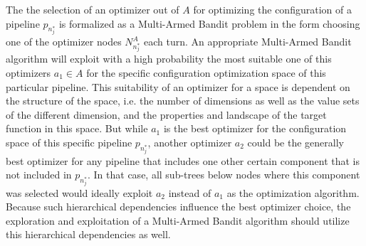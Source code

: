 The the selection of an optimizer out of $A$ for optimizing the configuration of a pipeline $p_{n^*_j}$ is formalized as a Multi-Armed Bandit problem in the form choosing one of the optimizer nodes $N^A_{n^*_j}$ each turn.
An appropriate Multi-Armed Bandit algorithm will exploit with a high probability the most suitable one of this optimizers $a_1 \in A$ for the specific configuration optimization space of this particular pipeline.
This suitability of an optimizer for a space is dependent on the structure of the space, i.e. the number of dimensions as well as the value sets of the different dimension, and the properties and landscape of the target function in this space.\newline
But while $a_1$ is the best optimizer for the configuration space of this specific pipeline $p_{n^*_j}$, another optimizer $a_2$ could be the generally best optimizer for any pipeline that includes one other certain component that is not included in $p_{n^*_j}$.
In that case, all sub-trees below nodes where this component was selected would ideally exploit $a_2$ instead of $a_1$ as the optimization algorithm.
Because such hierarchical dependencies influence the best optimizer choice, the exploration and exploitation of a Multi-Armed Bandit algorithm should utilize this hierarchical dependencies as well.


